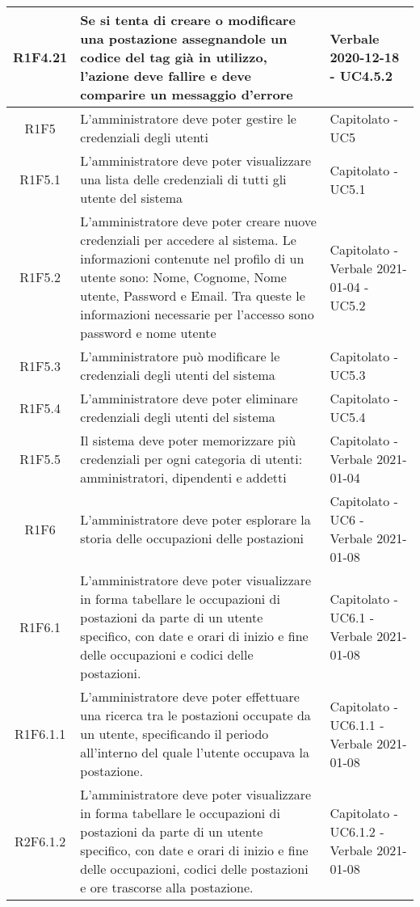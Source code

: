 \begin{center}
\begin{longtable}{|c|p{10cm}|p{4cm}|}
			R1F4.21&Se si tenta di creare o modificare una postazione assegnandole un codice del tag già in utilizzo, l'azione deve fallire e deve comparire un messaggio d'errore	&Verbale 2020-12-18 - UC4.5.2 	\\
					\hline
			R1F5&L'amministratore deve poter gestire le credenziali degli utenti	& Capitolato - UC5		\\
					\hline
R1F5.1&L'amministratore deve poter visualizzare una lista delle credenziali di tutti gli utente del sistema	& Capitolato - UC5.1	\\
					\hline
R1F5.2&L'amministratore deve poter creare nuove credenziali per accedere al sistema. Le informazioni contenute nel profilo di un utente sono: Nome, Cognome, Nome utente, Password e Email. Tra queste le informazioni necessarie per l'accesso sono password e nome utente	& Capitolato - Verbale 2021-01-04 - UC5.2	\\
						\hline
			R1F5.3&L'amministratore può modificare le credenziali degli utenti del sistema	&Capitolato - UC5.3 	\\
					\hline
			R1F5.4&L'amministratore deve poter eliminare credenziali degli utenti del sistema	& Capitolato - UC5.4	\\
					\hline
R1F5.5&Il sistema deve poter memorizzare più credenziali per ogni categoria di utenti: amministratori, dipendenti e addetti	& Capitolato - Verbale 2021-01-04	\\
					\hline
R1F6&L'amministratore deve poter esplorare la storia delle occupazioni delle postazioni	& Capitolato - UC6 - Verbale 2021-01-08	\\
						\hline
			R1F6.1&L'amministratore deve poter visualizzare in forma tabellare le occupazioni di postazioni da parte di un utente specifico, con date e orari di inizio e fine delle occupazioni e codici delle postazioni.	&Capitolato - UC6.1 - Verbale 2021-01-08	\\
					\hline
			R1F6.1.1&L'amministratore deve poter effettuare una ricerca tra le postazioni occupate da un utente, specificando il periodo all'interno del quale l'utente occupava la postazione. & 	Capitolato - UC6.1.1 - Verbale 2021-01-08\\
					\hline
			R2F6.1.2&L'amministratore deve poter visualizzare in forma tabellare le occupazioni di postazioni da parte di un utente specifico, con date e orari di inizio e fine delle occupazioni,  codici delle postazioni e ore trascorse alla postazione. & 	Capitolato - UC6.1.2 - Verbale 2021-01-08\\
			\hline

\end{longtable}
\end{center}
